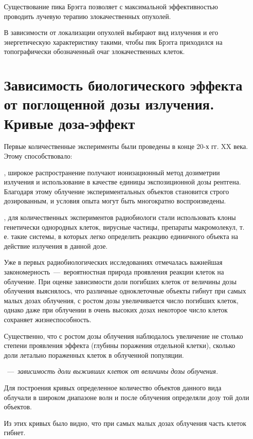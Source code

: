 \documentclass[a4paper, 14pt]{article}
\renewcommand{\emph}[1]{{\color{orange}{\textit{\textbf{#1}}}}}
\begin{document}
Существование пика Брэгга позволяет с максимальной эффективностью проводить лучевую терапию злокачественных опухолей. 

В зависимости от локализации опухолей выбирают вид излучения и его энергетическую характеристику такими, чтобы пик Брэгга приходился на топографически обозначенный очаг злокачественных клеток.

\section{Зависимость биологического эффекта от поглощенной дозы излучения.
Кривые доза-эффект}

Первые количественные эксперименты были проведены в конце 20-х гг. XX
века. Этому способствовало:

\emph{Во-первых}, широкое распространение получают ионизационный метод
дозиметрии излучения и использование в качестве единицы экспозиционной дозы
рентгена. Благодаря этому облучение экспериментальных объектов становится строго
дозированным, и условия опыта могут быть многократно воспроизведены.

\emph{Во-вторых}, для количественных экспериментов радиобиологи стали
использовать клоны генетически однородных клеток, вирусные частицы, препараты
макромолекул, т. е. такие системы, в которых легко определить реакцию единичного
объекта на действие излучения в данной дозе.

Уже в первых радиобиологических исследованиях отмечалась важнейшая
закономерность~---~вероятностная природа проявления реакции клеток на облучение.
При оценке зависимости доли погибших клеток от величины дозы облучения
выяснялось, что различные одноклеточные объекты гибнут при самых малых дозах
облучения, с ростом дозы увеличивается число погибших клеток, однако даже при
облучении в очень высоких дозах некоторое число клеток сохраняет
жизнеспособность.

Существенно, что с ростом дозы облучения наблюдалось увеличение не столько
степени проявления эффекта (глубины поражения отдельной клетки), сколько доли
летально пораженных клеток в облученной популяции.

\emph{Кривые доза-эффект}~---~\textit{зависимость доли выживших клеток от величины дозы
облучения.}

Для построения кривых определенное количество объектов данного вида
облучали в широком диапазоне волн и после облучения определяли дозу той доли
объектов.

Из этих кривых было видно, что при самых малых дозах облучения часть клеток
гибнет.
\end{document}
